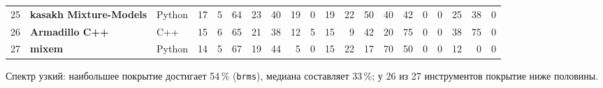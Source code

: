 \documentclass[10pt,a4paper]{article}
\begin{document}
\begin{landscape}
{\begin{longtable}{@{}r l l r r r r r r r *{10}{r}@{}}
25 & \textbf{kasakh Mixture-Models} & Python & 17 & 5 & 64 & \cellcolor{hm!21}23 & \cellcolor{hm!33}40 & \cellcolor{hm!18}19 & \cellcolor{hm!5}0 & \cellcolor{hm!18}19 & \cellcolor{hm!20}22 & \cellcolor{hm!40}50 & \cellcolor{hm!33}40 & \cellcolor{hm!34}42 & \cellcolor{hm!5}0 & \cellcolor{hm!5}0 & \cellcolor{hm!22}25 & \cellcolor{hm!31}38 & \cellcolor{hm!5}0 \\
26 & \textbf{Armadillo C++} & C++ & 15 & 6 & 65 & \cellcolor{hm!20}21 & \cellcolor{hm!32}38 & \cellcolor{hm!14}12 & \cellcolor{hm!8}5 & \cellcolor{hm!15}15 & \cellcolor{hm!11}9 & \cellcolor{hm!34}42 & \cellcolor{hm!19}20 & \cellcolor{hm!58}75 & \cellcolor{hm!5}0 & \cellcolor{hm!5}0 & \cellcolor{hm!31}38 & \cellcolor{hm!58}75 & \cellcolor{hm!5}0 \\
27 & \textbf{mixem} & Python & 14 & 5 & 67 & \cellcolor{hm!18}19 & \cellcolor{hm!36}44 & \cellcolor{hm!8}5 & \cellcolor{hm!5}0 & \cellcolor{hm!15}15 & \cellcolor{hm!20}22 & \cellcolor{hm!17}17 & \cellcolor{hm!54}70 & \cellcolor{hm!40}50 & \cellcolor{hm!5}0 & \cellcolor{hm!5}0 & \cellcolor{hm!14}12 & \cellcolor{hm!5}0 & \cellcolor{hm!5}0 \\
\bottomrule
\end{longtable}}
Спектр узкий: наибольшее покрытие достигает 54\,\% (\texttt{brms}),
медиана составляет 33\,\%; у 26 из 27 инструментов покрытие ниже половины.

\end{landscape}
\end{document}

